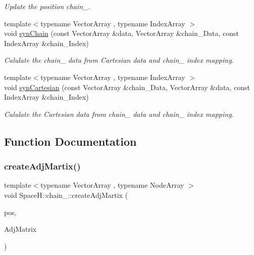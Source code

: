 \begin{DoxyCompactItemize}
\begin{DoxyCompactList}\small\item\em Update the position chain_. \end{DoxyCompactList}\item
{\footnotesize template$<$typename Vector\+Array , typename Index\+Array $>$ }\\void \mbox{\hyperlink{namespace_space_h_1_1chain_a218de9c738267dd3efceebfda0a90a43}{syn\+Chain}} (const Vector\+Array \&data, Vector\+Array \&chain_\+Data, const Index\+Array \&chain_\+Index)
\begin{DoxyCompactList}\small\item\em Calulate the chain_ data from Cartesian data and chain_ index mapping. \end{DoxyCompactList}\item
{\footnotesize template$<$typename Vector\+Array , typename Index\+Array $>$ }\\void \mbox{\hyperlink{namespace_space_h_1_1chain_a1ba7809b40a52959d0566753b1c2eaee}{syn\+Cartesian}} (const Vector\+Array \&chain_\+Data, Vector\+Array \&data, const Index\+Array \&chain_\+Index)
\begin{DoxyCompactList}\small\item\em Calulate the Cartesian data from chain_ data and chain_ index mapping. \end{DoxyCompactList}\end{DoxyCompactItemize}


\subsection{Function Documentation}
\mbox{\label{namespace_space_h_1_1chain_a8d2f8c8026f24294d16309c4f2e11fdb}} 
\subsubsection{\texorpdfstring{create\+Adj\+Martix()}{createAdjMartix()}}
{\footnotesize\ttfamily template$<$typename Vector\+Array , typename Node\+Array $>$ \\
void Space\+H\+::chain_\+::create\+Adj\+Martix (\begin{DoxyParamCaption}\item[{const Vector\+Array \&}]{pos,  }\item[{Node\+Array \&}]{Adj\+Matrix }\end{DoxyParamCaption})}



